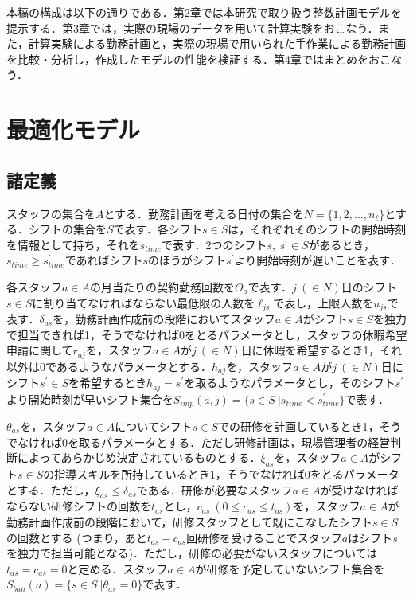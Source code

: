 \documentclass[11pt]{jsarticle}
\begin{document}
本稿の構成は以下の通りである．第2章では本研究で取り扱う整数計画モデルを提示する．第3章では，実際の現場のデータを用いて計算実験をおこなう．また，計算実験による勤務計画と，実際の現場で用いられた手作業による勤務計画を比較・分析し，作成したモデルの性能を検証する．第4章ではまとめをおこなう．
\newpage

\section{最適化モデル}
\subsection{諸定義}
スタッフの集合を$A$とする．勤務計画を考える日付の集合を$N = \{ 1, 2, ..., n_{\ell} \}$とする．シフトの集合を$S$で表す．各シフト$s \in S$は，それぞれそのシフトの開始時刻を情報として持ち，それを$s_{time}$で表す．2つのシフト$s, \ s^{\prime} \in S$があるとき，$s_{time} \geq s_{time}^{\prime}$であればシフト$s$のほうがシフト$s^{\prime}$より開始時刻が遅いことを表す．

各スタッフ$a \in A$の月当たりの契約勤務回数を$O_a$で表す．$j \ (\in N)$日のシフト$s \in S$に割り当てなければならない最低限の人数を$\ell_{js}$で表し，上限人数を$u_{js}$で表す．$\delta_{as}$を，勤務計画作成前の段階においてスタッフ$a \in A$がシフト$s \in S$を独力で担当できれば1，そうでなければ0をとるパラメータとし，スタッフの休暇希望申請に関して$r_{aj}$を，スタッフ$a \in A$が$j \ (\in N)$日に休暇を希望するとき1，それ以外は0であるようなパラメータとする．$h_{aj}$を，スタッフ$a \in A$が$j \ (\in N)$日にシフト$s^{\prime} \in S$を希望するとき$h_{aj} = s^{\prime}$を取るようなパラメータとし，そのシフト$s^{\prime}$より開始時刻が早いシフト集合を$S_{imp}(a, j) = \{s \in S \ |s_{time} < s_{time}^{\prime} \}$で表す．

$\theta_{as}$を，スタッフ$a \in A$についてシフト$s \in S$での研修を計画しているとき1，そうでなければ0を取るパラメータとする．ただし研修計画は，現場管理者の経営判断によってあらかじめ決定されているものとする．$\xi_{as}$を，スタッフ$a \in A$がシフト$s \in S$の指導スキルを所持しているとき1，そうでなければ0をとるパラメータとする．ただし，$\xi_{as} \leq \delta_{as}$である．研修が必要なスタッフ$a \in A$が受けなければならない研修シフトの回数を$t_{as}$とし，$c_{as} \ (0 \leq c_{as} \leq t_{as})$を，スタッフ$a \in A$が勤務計画作成前の段階において，研修スタッフとして既にこなしたシフト$s \in S$の回数とする (つまり，あと$t_{as} - c_{as}$回研修を受けることでスタッフ$a$はシフト$s$を独力で担当可能となる)．ただし，研修の必要がないスタッフについては$t_{as} = c_{as} = 0$と定める．スタッフ$a \in A$が研修を予定していないシフト集合を$S_{ban}(a) = \{ s \in S \ | \theta_{as} = 0 \}$で表す．
\end{document}
